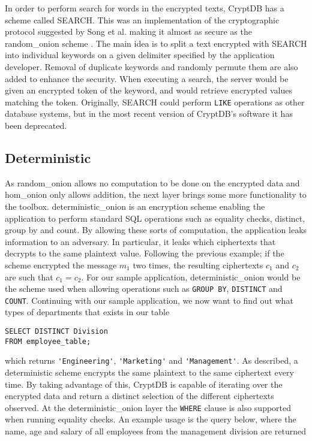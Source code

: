 In order to perform search for words in the encrypted texts, CryptDB has a scheme called SEARCH. This was an implementation of the cryptographic protocol suggested by Song et al. making it almost as secure as the \gls{random_onion} scheme \citep{CryptDB_Main_Paper}. The main idea is to split a text encrypted with SEARCH into individual keywords on a given delimiter specified by the application developer. Removal of duplicate keywords and randomly permute them are also added to enhance the security. When executing a search, the server would be given an encrypted token of the keyword, and would retrieve encrypted values matching the token. Originally, SEARCH could perform \texttt{LIKE} operations as other database systems, but in the most recent version of CryptDB's software it has been deprecated. 



\subsection{Deterministic}
\label{sec:det}

As \Gls{random_onion} allows no computation to be done on the encrypted data and \gls{hom_onion} only allows addition, the next layer brings some more functionality to the toolbox. \Gls{deterministic_onion} is an encryption scheme enabling the application to perform standard SQL operations such as equality checks, distinct, group by and count. By allowing these sorts of computation, the application leaks information to an adversary. In particular, it leaks which ciphertexts that decrypts to the same plaintext value. Following the previous example; if the scheme encrypted the message $m_1$ two times, the resulting ciphertexts $c_1$ and $c_2$ are such that $c_1 = c_2$. For our sample application, \Gls{deterministic_onion} would be the scheme used when allowing operations such as \verb!GROUP BY!, \verb!DISTINCT! and \verb!COUNT!. Continuing with our sample application, we now want to find out what types of departments that exists in our table

\begin{verbatim}
SELECT DISTINCT Division
FROM employee_table;
\end{verbatim}
\noindent
which returns \verb!'Engineering'!, \verb!'Marketing'! and \verb!'Management'!. As described, a deterministic scheme encrypts the same plaintext to the same ciphertext every time. By taking advantage of this, CryptDB is capable of iterating over the encrypted data and return a distinct selection of the different ciphertexts observed. At the \gls{deterministic_onion} layer the \verb!WHERE! clause is also supported when running equality checks. An example usage is the query below, where the name, age and salary of all employees from the management division are returned

